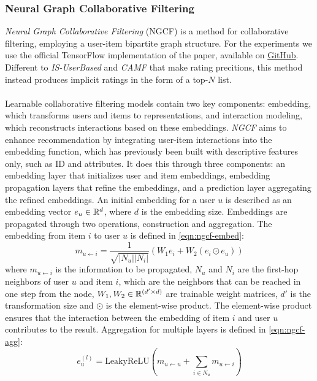 \subsubsection{Neural Graph Collaborative Filtering}\label{subsec:ngcf-desc}
\textit{Neural Graph Collaborative Filtering} (NGCF) is a method for collaborative filtering, employing a user-item bipartite graph structure.
For the experiments we use the official TensorFlow implementation of the paper, available on \href{https://github.com/xiangwang1223/neural_graph_collaborative_filtering}{GitHub}.
Different to \textit{IS-UserBased} and \textit{CAMF} that make rating precitions, this method instead produces implicit ratings in the form of a top-$N$ list.
\\\\
Learnable collaborative filtering models contain two key components: embedding, which transforms users and items to representations, and interaction modeling, which reconstructs interactions based on these embeddings.
\textit{NGCF} aims to enhance recommendation by integrating user-item interactions into the embedding function, which has previously been built with descriptive features only, such as ID and attributes.
It does this through three components: an embedding layer that initializes user and item embeddings, embedding propagation layers that refine the embeddings, and a prediction layer aggregating the refined embeddings.
An initial embedding for a user $u$ is described as an embedding vector $e_u \in \mathbb{R}^d$, where $d$ is the embedding size.
Embeddings are propagated through two operations, construction and aggregation.
The embedding from item $i$ to user $u$ is defined in \autoref{eqn:ngcf-embed}:
\begin{equation}\label{eqn:ngcf-embed}
    m_{u \leftarrow i} = \frac{1}{\sqrt{|N_u||N_i|}} (W_1e_i + W_2(e_i \odot e_u))
\end{equation}
where $m_{u \leftarrow i}$ is the information to be propagated, $N_u$ and $N_i$ are the first-hop neighbors of user $u$ and item $i$, which are the neighbors that can be reached in one step from the node, $W_1, W_2 \in \mathbb{R}^{(d' \times d)}$ are trainable weight matrices, $d'$ is the transformation size and $\odot$ is the element-wise product.
The element-wise product ensures that the interaction between the embedding of item $i$ and user $u$ contributes to the result.
Aggregation for multiple layers is defined in \autoref{eqn:ngcf-agg}:
\begin{equation}\label{eqn:ngcf-agg}
    e_{u}^{(l)} = \textrm{LeakyReLU}(m_{u \leftarrow u} + \sum_{i \in N_u} m_{u \leftarrow i})
\end{equation}
